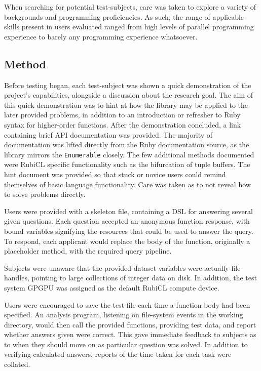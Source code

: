 When searching for potential test-subjects, care was taken to explore a variety of backgrounds and programming proficiencies.
As such, the range of applicable skills present in users evaluated ranged from high levels of parallel programming experience to barely any programming experience whatsoever.

\subsection{Method}
Before testing began, each test-subject was shown a quick demonstration of the project's capabilities, alongside a discussion about the research goal.
The aim of this quick demonstration was to hint at how the library may be applied to the later provided problems, in addition to an introduction or refresher to Ruby syntax for higher-order functions. After the demonstration concluded, a link\cite{user_test_hints} containing brief \ac{API} documentation was provided. The majority of documentation was lifted directly from the Ruby documentation source, as the library mirrors the \verb|Enumerable| closely. The few additional methods documented were RubiCL specific functionality such as the bifurcation of tuple buffers. The hint document was provided so that stuck or novice users could remind themselves of basic language functionality. Care was taken as to not reveal how to solve problems directly.

Users were provided with a skeleton file, containing a DSL for answering several given questions. Each question accepted an anonymous function response, with bound variables signifying the resources that could be used to answer the query. To respond, each applicant would replace the body of the function, originally a placeholder method, with the required query pipeline.

Subjects were unaware that the provided dataset variables were actually file handles, pointing to large collections of integer data on disk. In addition, the test system \ac{GPGPU} was assigned as the default RubiCL compute device.

Users were encouraged to save the test file each time a function body had been specified. An analysis program, listening on file-system events in the working directory, would then call the provided functions, providing test data, and report whether answers given were correct. This gave immediate feedback to subjects as to when they should move on as particular question was solved. In addition to verifying calculated answers, reports of the time taken for each task were collated.

